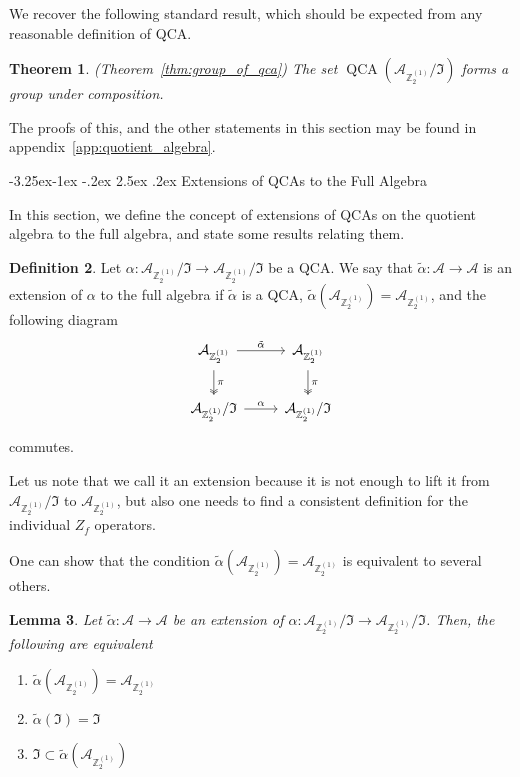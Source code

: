 \documentclass[aps,twocolumn,prx,floatfix,preprintnumbers, nofootinbib,10pt]{revtex4-2}
\makeatletter
\numberwithin{equation}{section}
\newtheorem{theorem}{Theorem}[section]
\newtheorem{lemma}[theorem]{Lemma}
\theoremstyle{definition}
\newtheorem{definition}[theorem]{Definition}
\theoremstyle{remark}
\theoremstyle{claim}
\newcommand{\be}{\begin{equation}}
\newcommand{\ee}{\end{equation}}
\newcommand{\Z}{{\mathbb Z}}
\renewcommand\subsubsection{\@startsection{subsubsection}{3}{\z@}%
                                     {-3.25ex\@plus -1ex \@minus -.2ex}%
                                     {2.5ex \@plus .2ex}%
                                     {\centering\itshape\bfseries\small}}
\newcommand{\mc}[1]{\mathcal{#1}}
\makeatother
\begin{document}
We recover the following standard result, which should be expected from any reasonable definition of QCA.

\begin{theorem}
 (Theorem~\ref{thm:group_of_qca}) The set $\operatorname{QCA}(\mc{A}_{\Z_2^{(1)}} / \mathfrak{I})$ forms a group under composition.
\end{theorem}

The proofs of this, and the other statements in this section may be found in appendix~\ref{app:quotient_algebra}.

\subsubsection{Extensions of QCAs to the Full Algebra}\label{sec:results_on_QCA_extendability}


In this section, we define the concept of extensions of QCAs on the quotient algebra to the full algebra, and state some results relating them.

\begin{definition}\label{def:QCA_extension}
 Let $\alpha : \mc{A}_{\Z_2^{(1)}} / \mathfrak{I} \rightarrow \mc{A}_{\Z_2^{(1)}} / \mathfrak{I}$ be a QCA. We say that $\tilde{\alpha} : \mc{A} \rightarrow \mc{A}$ is an extension of $\alpha$ to the full algebra if $\tilde{\alpha}$ is a QCA, $\tilde{\alpha}(\mc{A}_{\Z_2^{(1)}}) = \mc{A}_{\Z_2^{(1)}}$, and the following diagram
 \be
 \begin{tikzcd}[nodes={inner sep=5pt}]
  \mc{A}_{\Z_2^{(1)}} \arrow[r, "\tilde{\alpha}"] \arrow[d, "\pi", two heads] & \mc{A}_{\Z_2^{(1)}} \arrow[d, "\pi", two heads] \\
  \mc{A}_{\Z_2^{(1)}} / \mathfrak{I} \arrow[r, "\alpha"]      & \mc{A}_{\Z_2^{(1)}} / \mathfrak{I}
 \end{tikzcd}
 \ee
 commutes.
\end{definition}

Let us note that we call it an extension because it is not enough to lift it from $\mc{A}_{\Z_2^{(1)}} / \mathfrak{I}$ to $\mc{A}_{\Z_2^{(1)}}$, but also one needs to find a consistent definition for the individual $Z_f$ operators.

One can show that the condition $\tilde{\alpha}(\mc{A}_{\Z_2^{(1)}}) = \mc{A}_{\Z_2^{(1)}}$ is equivalent to several others.

\begin{lemma}
 Let $\tilde{\alpha} : \mc{A} \rightarrow \mc{A}$ be an extension of $\alpha : \mc{A}_{\Z_2^{(1)}} / \mathfrak{I} \rightarrow \mc{A}_{\Z_2^{(1)}} / \mathfrak{I}$. Then, the following are equivalent
 \begin{enumerate}
  \item $\tilde{\alpha}(\mc{A}_{\Z_2^{(1)}}) = \mc{A}_{\Z_2^{(1)}}$

  \item $\tilde{\alpha}(\mathfrak{I}) = \mathfrak{I}$

  \item $\mathfrak{I} \subset \tilde{\alpha}(\mc{A}_{\Z_2^{(1)}})$
 \end{enumerate}
\end{lemma}
\end{document}
